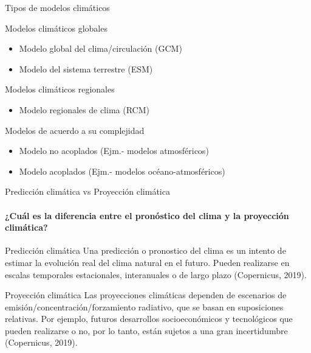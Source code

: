 \documentclass{beamer}
\begin{document}
\begin{frame} {Tipos de modelos climáticos}
 
\begin{block}{Modelos climáticos globales}
	\begin{itemize}
	\item Modelo global del clima/circulación (GCM)
	\item Modelo del sistema terrestre (ESM)
	\end{itemize}	
\end{block}
 
\begin{block}{Modelos climáticos regionales}
	\begin{itemize}
	\item Modelo regionales de clima (RCM)	
	\end{itemize}
\end{block}

\begin{block}{Modelos de acuerdo a su complejidad}
	\begin{itemize}
	\item Modelo no acoplados (Ejm.- modelos atmosféricos)	
	\item Modelo acoplados (Ejm.- modelos océano-atmosféricos)	
	\end{itemize}
\end{block}

\end{frame}

\begin{frame} {Predicción climática vs Proyección climática}
\framesubtitle{¿Cuál es la diferencia entre el pronóstico del clima y la proyección climática?}

\begin{block}{Predicción climática}
Una predicción o pronostico del clima es un intento de estimar la evolución real del clima natural en el futuro. Pueden realizarse en escalas temporales estacionales, interanuales o de largo plazo (Copernicus, 2019).	
\end{block}

\begin{block}{Proyección climática}
Las proyecciones climáticas dependen de escenarios de emisión/concentración/forzamiento radiativo, que se basan en suposiciones relativas. Por ejemplo, futuros desarrollos socioeconómicos y tecnológicos que pueden realizarse o no, por lo tanto, están sujetos a una gran incertidumbre (Copernicus, 2019).

\end{block}

\end{frame}
\end{document}
